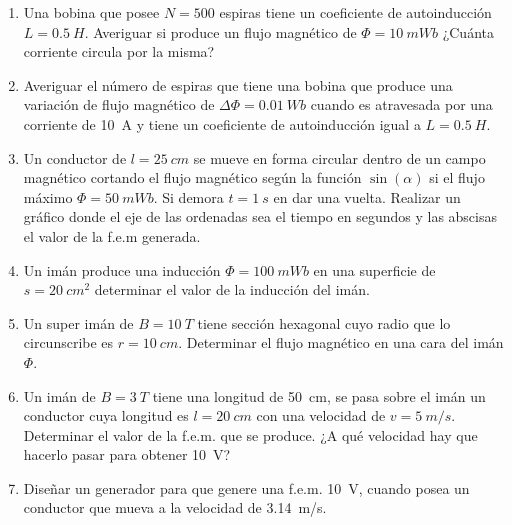 \documentclass[../main]{subfiles}
\begin{document}
\begin{enumerate}
  \item Una bobina que posee $N=500$ espiras tiene un coeficiente de autoinducci\'on $L=\qty{0,5}{H}$. Averiguar si produce un flujo magn\'etico de $\Phi=\qty{10}{mWb}$ ¿Cu\'anta corriente circula por la misma?

  \item Averiguar el n\'umero de espiras que tiene una bobina que produce una variaci\'on de flujo magn\'etico de $\Delta \Phi=\qty{0,01}{Wb}$ cuando es atravesada por una corriente de \qty{10}{A} y tiene un coeficiente de autoinducci\'on igual a $L=\qty{0,5}{H}$.

  \item Un conductor de $l=\qty{25}{cm}$ se mueve en forma circular dentro de un campo magn\'etico cortando el flujo magn\'etico seg\'un la funci\'on $\sin(\alpha)$ si el flujo m\'aximo $\Phi=\qty{50}{mWb}$. Si demora $t=\qty{1}{s}$ en dar una vuelta. Realizar un gr\'afico donde el eje de las ordenadas sea el tiempo en segundos y las abscisas el valor de la f.e.m generada.

  \item Un im\'an produce una inducci\'on $\Phi=\qty{100}{mWb}$ en una superficie de $s=\qty{20}{cm^2}$ determinar el valor de la inducci\'on del im\'an.

  \item Un super im\'an de $B=\qty{10}{T}$ tiene secci\'on hexagonal cuyo radio que lo circunscribe es $r=\qty{10}{cm}$. Determinar el flujo magn\'etico en una cara del im\'an $\Phi$.

  \item Un im\'an de $B=\qty{3}{T}$ tiene una longitud de \qty{50}{cm}, se pasa sobre el im\'an un conductor cuya longitud es $l=\qty{20}{cm}$ con una velocidad de $v=\qty{5}{m/s}$. Determinar el valor de la f.e.m. que se produce. ¿A qu\'e velocidad hay que hacerlo pasar para obtener \qty{10}{V}?

  \item Dise\~nar un generador para que genere una f.e.m. \qty{10}{V}, cuando posea un conductor que mueva a la velocidad de \qty{3,14}{m/s}.
\end{enumerate}
\end{document}
